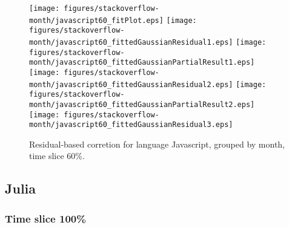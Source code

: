 \begin{figure}[hb]
\centering
{}
{\texttt{[image: figures/stackoverflow-month/javascript60\_fitPlot.eps]}}
{\texttt{[image: figures/stackoverflow-month/javascript60\_fittedGaussianResidual1.eps]}}
{\texttt{[image: figures/stackoverflow-month/javascript60\_fittedGaussianPartialResult1.eps]}}
{\texttt{[image: figures/stackoverflow-month/javascript60\_fittedGaussianResidual2.eps]}}
{\texttt{[image: figures/stackoverflow-month/javascript60\_fittedGaussianPartialResult2.eps]}}
{\texttt{[image: figures/stackoverflow-month/javascript60\_fittedGaussianResidual3.eps]}}
\caption{Residual-based corretion for language Javascript, grouped by month, time slice 60\%.}
\end{figure}


\clearpage 
\newpage 


\subsection{Julia}

\FloatBarrier

\subsubsection{Time slice 100\%}

